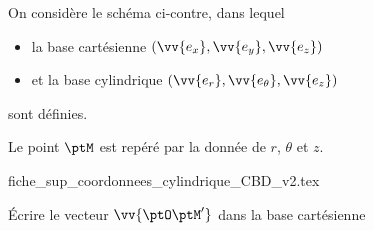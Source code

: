 \initialisationPartieGauche %
 On considère le schéma ci-contre, dans lequel 
 \begin{itemize}
 \item la base cartésienne $(\vv{e_x},\vv{e_y},\vv{e_z})$ 
 \item et la base cylindrique  $(\vv{e_r},\vv{e_\theta},\vv{e_z})$
 \end{itemize}
  sont définies.
  
  Le point $\ptM$ est repéré par la donnée de $r$, $\theta$ et $z$.
\initialisationPartieDroite %
\begin{center}
	{fiche_sup_coordonnees_cylindrique_CBD_v2.tex}
\end{center}
\finalisationDuPartageDePage %




\debutEntrainement



\begin{enonce}
	Écrire le vecteur $\vv{\ptO \ptM'}$ dans la base cartésienne
\end{enonce}

